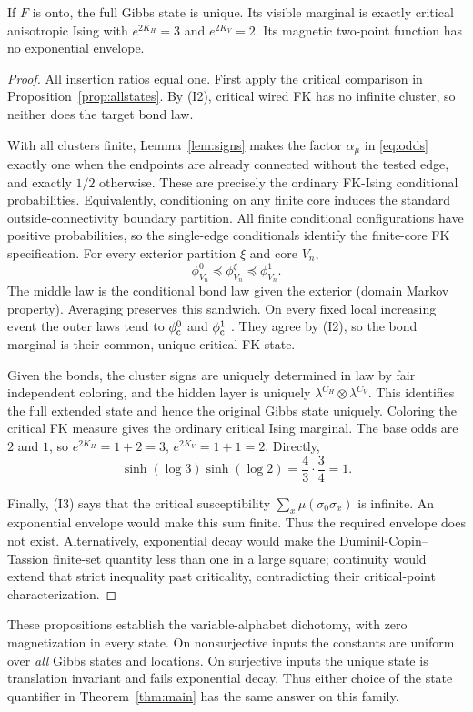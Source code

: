 \begin{proposition}\label{prop:onto}
If \(F\) is onto, the full Gibbs state is unique. Its visible marginal is exactly critical anisotropic Ising with \(e^{2K_H}=3\) and \(e^{2K_V}=2\). Its magnetic two-point function has no exponential envelope.
\end{proposition}
\begin{proof}
All insertion ratios equal one. First apply the critical comparison in Proposition~\ref{prop:allstates}. By (I2), critical wired FK has no infinite cluster, so neither does the target bond law.

With all clusters finite, Lemma~\ref{lem:signs} makes the factor \(\alpha_\mu\) in \eqref{eq:odds} exactly one when the endpoints are already connected without the tested edge, and exactly \(1/2\) otherwise. These are precisely the ordinary FK-Ising conditional probabilities. Equivalently, conditioning on any finite core induces the standard outside-connectivity boundary partition. All finite conditional configurations have positive probabilities, so the single-edge conditionals identify the finite-core FK specification. For every exterior partition $\xi$ and core $V_n$,
\[
 \phi^0_{V_n}\preceq\phi^\xi_{V_n}\preceq\phi^1_{V_n}.
\]
The middle law is the conditional bond law given the exterior (domain Markov property). Averaging preserves this sandwich. On every fixed local increasing event the outer laws tend to $\phi^0_{\mathrm c}$ and $\phi^1_{\mathrm c}$ \cite[Lemmas 4.13--4.14, Theorem 4.19]{Grimmett}. They agree by (I2), so the bond marginal is their common, unique critical FK state.

Given the bonds, the cluster signs are uniquely determined in law by fair independent coloring, and the hidden layer is uniquely \(\lambda^{C_H}\otimes\lambda^{C_V}\). This identifies the full extended state and hence the original Gibbs state uniquely. Coloring the critical FK measure gives the ordinary critical Ising marginal. The base odds are \(2\) and \(1\), so \(e^{2K_H}=1+2=3\), \(e^{2K_V}=1+1=2\). Directly,
\begin{equation}
 \sinh(\log3)\sinh(\log2)=\frac43\cdot\frac34=1.
\end{equation}

Finally, (I3) says that the critical susceptibility
\(\sum_x\mu(\sigma_0\sigma_x)\) is infinite. An exponential envelope would make this sum finite. Thus the required envelope does not exist. Alternatively, exponential decay would make the Duminil-Copin--Tassion finite-set quantity less than one in a large square; continuity would extend that strict inequality past criticality, contradicting their critical-point characterization.
\end{proof}

These propositions establish the variable-alphabet dichotomy, with zero magnetization in every state. On nonsurjective inputs the constants are uniform over \emph{all} Gibbs states and locations. On surjective inputs the unique state is translation invariant and fails exponential decay. Thus either choice of the state quantifier in Theorem~\ref{thm:main} has the same answer on this family.
